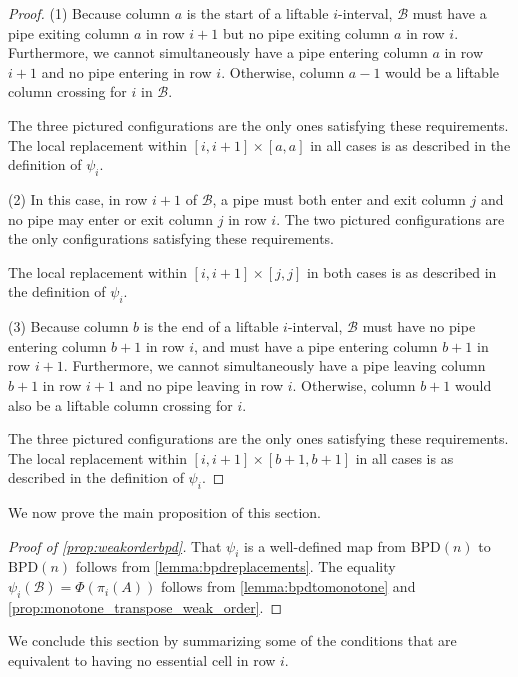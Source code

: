 \documentclass[12 pt]{amsart}
\numberwithin{equation}{section}
\newcommand{\bpd}{\mathrm{BPD}}
\newcommand{\asmtobpd}{\Phi}
\theoremstyle{remark}
\begin{document}
\begin{proof}
    \noindent (1) Because column $a$ is the start of a liftable $i$-interval, $\mathcal B$ must have a pipe exiting column $a$ in row $i+1$ but no pipe exiting column $a$ in row $i$.  Furthermore, we cannot simultaneously have a pipe entering column $a$ in row $i+1$ and no pipe entering in row $i$.  Otherwise, column $a-1$ would be a liftable column crossing for $i$ in $\mathcal B$.
    
The three pictured configurations are the only ones satisfying these requirements. The local replacement within $[i,i+1]\times [a,a]$ in all cases is as described in the definition of $\psi_i$.

    \noindent (2) In this case, in row $i+1$ of $\mathcal B$, a pipe must both enter and exit column $j$ and no pipe may enter or exit column $j$ in row $i$.  The two pictured configurations are the only configurations satisfying these requirements. 
 
 The local replacement within $[i,i+1]\times [j,j]$ in both cases is as described in the definition of $\psi_i$.

    \noindent (3) Because column $b$ is the end of a liftable $i$-interval, $\mathcal{B}$ must have no pipe entering column $b+1$ in row $i$, and must have a pipe entering column $b+1$ in row $i+1$.  Furthermore, we cannot simultaneously have a pipe leaving column $b+1$ in row $i+1$ and no pipe leaving in row $i$.  Otherwise, column $b+1$ would also be a liftable column crossing for $i$.

    The three pictured configurations are the only ones satisfying these requirements.  The local replacement within $[i,i+1]\times [b+1,b+1]$ in all cases is as described in the definition of $\psi_i$.
\end{proof}

We now prove the main proposition of this section.
\begin{proof}[{Proof of \cref{prop:weakorderbpd}}]
    That $\psi_i$ is a well-defined map from $\bpd(n)$ to $\bpd(n)$ follows from \cref{lemma:bpdreplacements}.  The equality $\psi_i(\mathcal B)=\asmtobpd(\pi_i(A))$ follows from \cref{lemma:bpdtomonotone} and \cref{prop:monotone_transpose_weak_order}.
\end{proof}

We conclude this section by summarizing some of the conditions that are equivalent to having no essential cell in row $i$.
\end{document}
